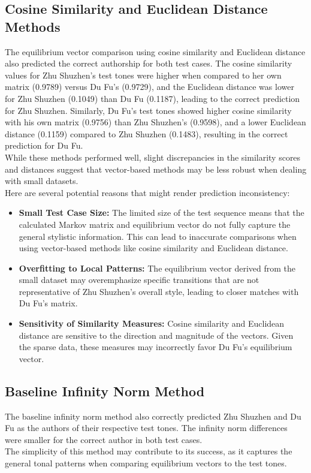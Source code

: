 \documentclass[12pt]{article}
\begin{document}
\subsection*{Cosine Similarity and Euclidean Distance Methods}
The equilibrium vector comparison using cosine similarity and Euclidean distance also predicted the correct authorship for both test cases. 
The cosine similarity values for Zhu Shuzhen's test tones were higher when compared to her own matrix (0.9789) versus Du Fu’s (0.9729), and the Euclidean distance was lower for Zhu Shuzhen (0.1049) than Du Fu (0.1187), leading to the correct prediction for Zhu Shuzhen. 
Similarly, Du Fu's test tones showed higher cosine similarity with his own matrix (0.9756) than Zhu Shuzhen's (0.9598), and a lower Euclidean distance (0.1159) compared to Zhu Shuzhen (0.1483), resulting in the correct prediction for Du Fu.
\\
While these methods performed well, slight discrepancies in the similarity scores and distances suggest that vector-based methods may be less robust when dealing with small datasets.
\\
\noindent Here are several potential reasons that might render prediction inconsistency:
\begin{itemize}
    \item \textbf{Small Test Case Size:} The limited size of the test sequence means that the calculated Markov matrix and equilibrium vector do not fully capture the general stylistic information. This can lead to inaccurate comparisons when using vector-based methods like cosine similarity and Euclidean distance.
    \item \textbf{Overfitting to Local Patterns:} The equilibrium vector derived from the small dataset may overemphasize specific transitions that are not representative of Zhu Shuzhen’s overall style, leading to closer matches with Du Fu's matrix.
    \item \textbf{Sensitivity of Similarity Measures:} Cosine similarity and Euclidean distance are sensitive to the direction and magnitude of the vectors. Given the sparse data, these measures may incorrectly favor Du Fu's equilibrium vector.
\end{itemize}

\subsection*{Baseline Infinity Norm Method}
The baseline infinity norm method also correctly predicted Zhu Shuzhen and Du Fu as the authors of their respective test tones. The infinity norm differences were smaller for the correct author in both test cases.
\\
The simplicity of this method may contribute to its success, as it captures the general tonal patterns when comparing equilibrium vectors to the test tones.
\end{document}
